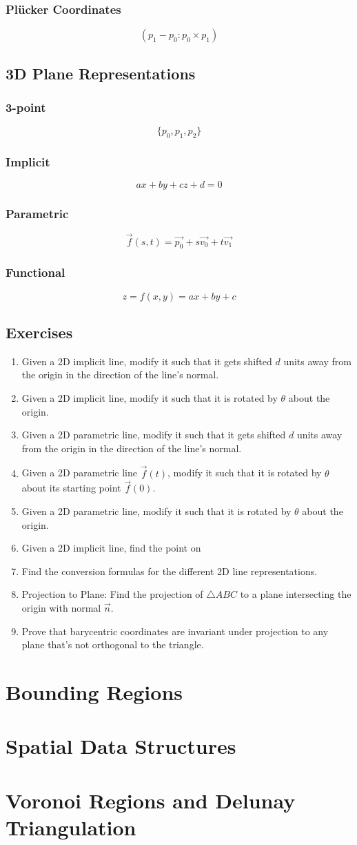 \documentclass[12pt]{report}
\begin{document}
	\subsection{Plücker Coordinates}
	$$
		(p_1 - p_0: p_0 \times p_1)
	$$
\section{3D Plane Representations}
	\subsection{3-point}
		$$
		\{p_0, p_1, p_2\}
	$$
	\subsection{Implicit}
		$$
		ax + by + cz + d = 0
	$$
	\subsection{Parametric}
	$$
	\vec{f}(s, t) = \vec{p_0} + s\vec{v_0} + t\vec{v_1}
	$$
	\subsection{Functional}
		$$
		z = f(x, y) = ax + by + c
		$$
\section{Exercises}
\begin{enumerate}
	\item Given a 2D implicit line, modify it such that it gets shifted $d$ units away from the origin in the direction of the line's normal.
	\item Given a 2D implicit line, modify it such that it is rotated by $\theta$ about the origin.
	\item Given a 2D parametric line, modify it such that it gets shifted $d$ units away from the origin in the direction of the line's normal.
	\item Given a 2D parametric line $\vec{f}(t)$, modify it such that it is rotated by $\theta$ about its starting point $\vec{f}(0)$.
	\item Given a 2D parametric line, modify it such that it is rotated by $\theta$ about the origin.
	\item Given a 2D implicit line, find the point on 
	\item Find the conversion formulas for the different 2D line representations.
	\item Projection to Plane: Find the projection of $\triangle ABC$ to a plane intersecting the origin with normal $\vec{n}$.
	\item Prove that barycentric coordinates are invariant under projection to any plane that's not orthogonal to the triangle.
\end{enumerate}	
\chapter{Bounding Regions}
\chapter{Spatial Data Structures}
\chapter{Voronoi Regions and Delunay Triangulation}
\end{document}
